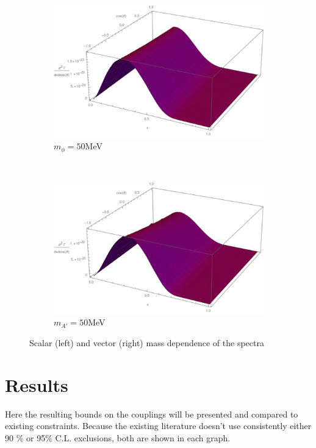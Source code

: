 \begin{figure}[H]
    \begin{subfigure}[b]{0.45\textwidth}
    \includegraphics[width=\textwidth]{imgs/S0-05}
    \caption{$m_\phi = 50$MeV}
    \end{subfigure}
    ~
    \begin{subfigure}[b]{0.45\textwidth}
    \includegraphics[width=\textwidth]{imgs/V0-05}
    \caption{$m_{A'} = 50$MeV}
    \end{subfigure}
    \caption{Scalar (left) and vector (right) mass dependence of the spectra}
    \label{fg:MassDependence}
\end{figure}
\newpage
\section{Results}
Here the resulting bounds on the couplings will be presented and compared to existing constraints. Because the existing literature doesn't use consistently either 90 \% or 95\% C.L. exclusions, both are shown in each graph. 
